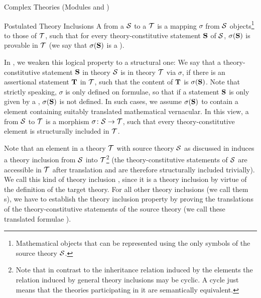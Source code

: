 \begin{tchapter}[id=complex-theories,short=Complex Theories]{Complex Theories (Modules
    {} and {})}
\begin{tsection}[id=theory-inclusions]{Postulated Theory Inclusions}
  A {} from a {} ${\cal S}$ to a
  {} ${\cal T}$ is a mapping $\sigma$ from ${\cal S}$
  objects\footnote{Mathematical objects that can be represented using the only symbols of
    the source theory ${\cal S}$.} to those of ${\cal T}$, such that for every theory-constitutive
  statement ${\bf S}$ of ${\cal S}$, $\sigma({\bf S})$ is provable in ${\cal T}$ (we say that $\sigma({\bf S})$
  is a {}).
   
  In {\omdoc}, we weaken this logical property to a structural one: We say that a
  theory-constitutive statement ${\bf S}$ in theory ${\cal S}$ is
  {} in theory ${\cal T}$ via $\sigma$, if there is an
  assertional statement ${\bf T}$ in ${\cal T}$, such that the content
  of ${\bf T}$ is $\sigma({\bf S})$.  Note that strictly speaking, $\sigma$ is only defined on
  formulae, so that if a statement ${\bf S}$ is only given by a {}, $\sigma({\bf S})$
  is not defined. In such cases, we assume $\sigma({\bf S})$ to contain a {}
  element containing suitably translated mathematical vernacular. In this view, a
  {} from ${\cal S}$ to ${\cal T}$ is a morphism
  $\sigma\colon{\cal S}\to{\cal T}$, such that every theory-constitutive element is structurally
  included in ${\cal T}$.
  
  Note that an {} element in a theory ${\cal T}$ with source theory ${\cal S}$ as
  discussed in {} induces a theory inclusion from ${\cal S}$ into
  ${\cal T}$\footnote{Note that in contrast to the inheritance relation induced by the
    {} elements the relation induced by general theory inclusions may be
    cyclic. A cycle just means that the theories participating in it are semantically
    equivalent.} (the theory-constitutive statements of ${\cal S}$ are
  accessible in ${\cal T}$ after translation and are therefore structurally included
  trivially).  We call this kind of theory inclusion
  {}, since it is a theory
  inclusion by virtue of the definition of the target theory.  For all other theory
  inclusions (we call them {s}), we have to
  establish the theory inclusion property by proving the translations of the
  theory-constitutive statements of the source theory (we call these translated formulae
  {}).


\end{tsection}
\end{tchapter}
